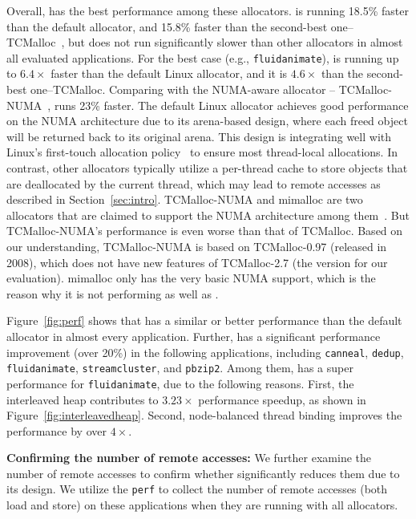Overall, \NM{} has the best performance among these allocators. \NM{} is running 18.5\% faster than the default allocator, and 15.8\% faster than the second-best one--TCMalloc~\cite{tcmalloc}, but does not run significantly slower than other allocators in almost all evaluated applications. For the best case (e.g., \texttt{fluidanimate}), \NM{} is running up to $6.4\times$ faster than the default Linux allocator, and it is $4.6\times$ than the second-best one--TCMalloc.  Comparing with the NUMA-aware allocator -- TCMalloc-NUMA~\cite{tcmallocnew}, \NM{} runs 23\% faster. The default Linux allocator achieves good performance on the NUMA architecture due to its arena-based design, where each freed object will be returned back to its original arena.
This design is integrating well with Linux's first-touch allocation policy~\cite{Lameter:2013:NO:2508834.2513149} to ensure most thread-local allocations. 
In contrast, other allocators typically utilize a per-thread cache to store objects that are deallocated by the current thread, which may lead to remote accesses as described in Section~\ref{sec:intro}.  TCMalloc-NUMA and mimalloc are two allocators that are claimed to support the NUMA architecture among them~\cite{tcmallocnew}. But TCMalloc-NUMA's performance is even worse than that of TCMalloc. Based on our understanding, TCMalloc-NUMA is based on TCMalloc-0.97 (released in 2008), which does not have new features of TCMalloc-2.7 (the version for our evaluation). mimalloc only has the very basic NUMA support, which is the reason why it is not performing as well as \NM{}.  


Figure~\ref{fig:perf} shows that \NM{} has a similar or better performance than the default allocator in almost every application. Further, \NM{} has a significant performance improvement (over 20\%) in the following applications, including \texttt{canneal}, \texttt{dedup}, \texttt{fluidanimate}, \texttt{streamcluster}, and \texttt{pbzip2}. Among them, \NM{} has a super performance for \texttt{fluidanimate}, due to the following reasons. First, the interleaved heap contributes to $3.23\times$ performance speedup, as shown in Figure~\ref{fig:interleavedheap}. Second, node-balanced thread binding improves the performance by over $4\times$. 

\textbf{Confirming the number of remote accesses:} We further examine the number of remote accesses to confirm whether \NM{} significantly reduces them due to its design. We utilize the \texttt{perf} to collect the number of remote accesses (both load and store) on these applications when they are running with all allocators. 

